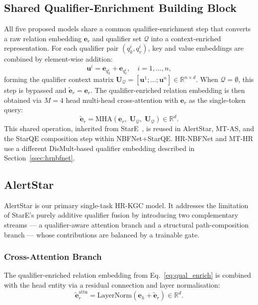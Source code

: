 \documentclass[10pt,journal,compsoc]{IEEEtran}
\begin{document}
\subsection{Shared Qualifier-Enrichment Building Block}
\label{ssec:qual_enrich}

All five proposed models share a common qualifier-enrichment
step that converts a raw relation embedding $\mathbf{e}_r$
and qualifier set $\mathcal{Q}$ into a context-enriched
representation.
For each qualifier pair $(q_k^i, q_v^i)$, key and value
embeddings are combined by element-wise addition:
\begin{equation}
  \mathbf{u}^i = \mathbf{e}_{q_k^i} + \mathbf{e}_{q_v^i},
  \quad i = 1, \ldots, n,
  \label{eq:kv_add}
\end{equation}
forming the qualifier context matrix
$\mathbf{U}_{\mathcal{Q}} =
 [\mathbf{u}^1;\ldots;\mathbf{u}^n]
 \in \mathbb{R}^{n \times d}$.
When $\mathcal{Q} = \emptyset$, this step is bypassed and
$\tilde{\mathbf{e}}_r = \mathbf{e}_r$.
The qualifier-enriched relation embedding is then obtained
via $M{=}4$ head multi-head cross-attention with
$\mathbf{e}_r$ as the single-token query:
\begin{equation}
  \tilde{\mathbf{e}}_r
  = \mathrm{MHA}\!\left(
      \mathbf{e}_r,\;
      \mathbf{U}_{\mathcal{Q}},\;
      \mathbf{U}_{\mathcal{Q}}
    \right) \in \mathbb{R}^d.
  \label{eq:qual_enrich}
\end{equation}
This shared operation, inherited from StarE~\cite{galkin2020message},
is reused in AlertStar, MT-AS, and the StarQE composition step
within NBFNet+StarQE.
HR-NBFNet and MT-HR use a different DisMult-based qualifier
embedding described in Section~\ref{ssec:hrnbfnet}.

\subsection{AlertStar}
\label{ssec:alertstar}

AlertStar is our primary single-task HR-KGC model.
It addresses the limitation of StarE's purely additive
qualifier fusion by introducing two complementary streams
— a qualifier-aware attention branch and a structural
path-composition branch — whose contributions are balanced
by a trainable gate.

\subsubsection{Cross-Attention Branch}
The qualifier-enriched relation embedding from
Eq.~\eqref{eq:qual_enrich} is combined with the head entity
via a residual connection and layer normalisation:
\begin{equation}
  \tilde{\mathbf{e}}_r^{\mathrm{attn}}
  = \mathrm{LayerNorm}\!\left(
      \mathbf{e}_h + \tilde{\mathbf{e}}_r
    \right) \in \mathbb{R}^d.
  \label{eq:as_attn}
\end{equation}
\end{document}
